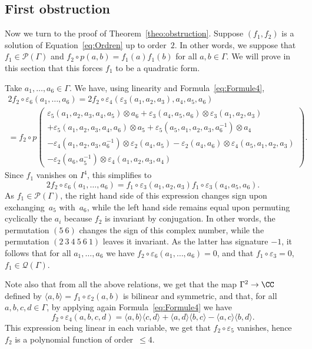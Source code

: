 \subsection{First obstruction}
Now we turn to the proof of Theorem~\ref{theo:obstruction}. Suppose
$(f_1,f_2)$ is a solution of Equation~\eqref{eq:Ordren} up to order~$2$.
In other words, we suppose that $f_1\in\mathcal{P}(\Gamma)$ and
$f_2\circ p(a,b)=f_1(a)f_1(b)$ for all $a,b\in\Gamma$. We will prove in
this section that this forces $f_1$ to be a quadratic form.

Take $a_1,\ldots,a_6\in\Gamma$. We have, using linearity and
Formula~\eqref{eq:Formule4},
\begin{multline*}
2f_2\circ\varepsilon_6(a_1, \ldots,a_6) =
2f_2\circ\varepsilon_4(\varepsilon_3(a_1,a_2,a_3), a_4,a_5,a_6) \\
= f_2\circ p\left(\begin{array}{c}
\varepsilon_5(a_1,a_2,a_3,a_4,a_5)\otimes a_6+\varepsilon_3(a_4,a_5,a_6)
\otimes\varepsilon_3(a_1,a_2,a_3) \\
+\varepsilon_5(a_1,a_2,a_3,a_4,a_6)\otimes a_5+
\varepsilon_5(a_5,a_1,a_2,a_3,a_6^{-1})\otimes a_4 \\
-\varepsilon_4(a_1,a_2,a_3,a_6^{-1})\otimes\varepsilon_2(a_4,a_5)
-\varepsilon_2(a_4,a_6)\otimes\varepsilon_4(a_5,a_1,a_2,a_3) \\
-\varepsilon_2(a_6,a_5^{-1})\otimes\varepsilon_4(a_1,a_2,a_3,a_4)
\end{array}\right).
\end{multline*}
Since $f_1$ vanishes on $I^4$, this simplifies to
\[ 2f_2\circ\varepsilon_6(a_1,\ldots,a_6)=f_1\circ\varepsilon_3(a_1,a_2,a_3)
f_1\circ\varepsilon_3(a_4,a_5,a_6). \]
As $f_1\in \mathcal{P}(\Gamma)$, the right hand side of this expression
changes sign upon exchanging~$a_5$ with~$a_6$, while the left hand side
remains equal upon permuting cyclically the $a_i$ because $f_2$ is invariant
by conjugation. In other words, the permutation $(5~6)$ changes the sign of
this complex number, while the permutation $(2~3~4~5~6~1)$ leaves it
invariant. As the latter has signature $-1$, it follows that for all
$a_1,\ldots,a_6$ we have $f_2\circ\varepsilon_6(a_1,\ldots, a_6)=0$,
and that $f_1\circ\varepsilon_3=0$, \ie $f_1\in\mathcal{Q}(\Gamma)$.

Note also that from all the above relations, we get that the map
$\Gamma^2\to\CC$ defined by $\langle a,b\rangle= f_1\circ\varepsilon_2(a,b)$
is bilinear and symmetric, and that, for all $a,b,c,d\in\Gamma$, by applying
again Formula~\eqref{eq:Formule4} we have
\begin{equation}
\label{eq:carre} f_2\circ\varepsilon_4(a,b,c,d)=
\langle a,b\rangle \langle c,d\rangle+\langle a,d\rangle\langle b,c\rangle
-\langle a,c\rangle\langle b,d\rangle.
\end{equation}
This expression being linear in each variable, we get that
$f_2\circ\varepsilon_5$ vanishes, hence $f_2$ is a polynomial function of
order~$\leq 4$.

